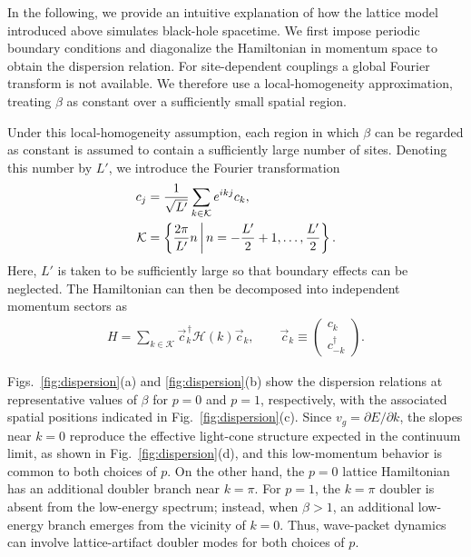 \documentclass[reprint,amsmath,amssymb,aps,prb,showkeys]{revtex4-2}
\begin{document}
In the following, we provide an intuitive explanation of how the lattice model introduced above simulates black-hole spacetime.
We first impose periodic boundary conditions and diagonalize the Hamiltonian in momentum space to obtain the dispersion relation.
For site-dependent couplings a global Fourier transform is not available.
We therefore use a local-homogeneity approximation, treating $\beta$ as constant over a sufficiently small spatial region.

Under this local-homogeneity assumption, each region in which $\beta$ can be regarded as constant is assumed to contain a sufficiently large number of sites.
Denoting this number by $L'$, we introduce the Fourier transformation
\begin{align}
c_j
&=
\frac{1}{\sqrt{L'}}
\sum_{k\in\mathcal{K}}
e^{ikj}c_k,
\notag\\
\mathcal{K}
&=
\left\{
\frac{2\pi}{L'}n
\,\bigg|\,
n=-\frac{L'}{2}+1,\ldots,\frac{L'}{2}
\right\}.
\label{eq:fourier_local}
\end{align}
Here, $L'$ is taken to be sufficiently large so that boundary effects can be neglected.
The Hamiltonian can then be decomposed into independent momentum sectors as
\begin{align}
H
=
\sum_{k\in\mathcal{K}}
\vec{c}_k^{\,\dagger}
\mathcal{H}(k)
\vec{c}_k,
\qquad
\vec{c}_k
\equiv
\begin{pmatrix}
c_k\\
c_{-k}^{\dagger}
\end{pmatrix}.
\end{align}

Figs.~\ref{fig:dispersion}(a) and \ref{fig:dispersion}(b) show the dispersion relations at representative values of $\beta$ for $p=0$ and $p=1$, respectively, with the associated spatial positions indicated in Fig.~\ref{fig:dispersion}(c).
Since $v_g=\partial E/\partial k$, the slopes near $k=0$ reproduce the effective light-cone structure expected in the continuum limit, as shown in Fig.~\ref{fig:dispersion}(d), and this low-momentum behavior is common to both choices of $p$.
On the other hand, the $p=0$ lattice Hamiltonian has an additional doubler branch near $k=\pi$.
For $p=1$, the $k=\pi$ doubler is absent from the low-energy spectrum; instead, when $\beta>1$, an additional low-energy branch emerges from the vicinity of $k=0$.
Thus, wave-packet dynamics can involve lattice-artifact doubler modes for both choices of $p$.
\end{document}
